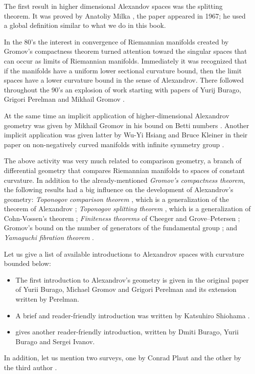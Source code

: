 The first result in higher dimensional Alexandov spaces was the splitting theorem.
It was proved by Anatoliy Milka \cite{milka-line}, the paper appeared in 1967;
he used a global definition similar to what we do in this book.

In the 80's the interest in convergence of Riemannian manifolds created by Gromov's compactness theorem \cite{gromov-MS} turned attention toward the singular spaces that can occur as limits of Riemannian manifolds.
Immediately it was recognized that if the manifolds have a uniform lower sectional curvature bound, then the limit spaces have a lower curvature bound in the sense of Alexandrov. 
There followed throughout the 90's an explosion of work starting with papers of Yurij Burago, Grigori Perelman and Mikhail Gromov  \cite{burago-gromov-perelman,perelman:spaces2}.

At the same time an implicit application of higher-dimensional Alexandrov geometry was given by Mikhail Gromov in his bound on Betti numbers \cite{gromov:betti}.
Another implicit application was given latter by Wu-Yi Hsiang and Bruce Kleiner in their paper on non-negatively curved manifolds with infinite symmetry group \cite{hsiang-kleiner}.

The above activity was very much related to comparison geometry,
a branch of differential geometry that compares Riemannian manifolds  to  spaces of constant curvature.
In addition to the already-mentioned \emph{Gromov's compactness theorem},
the following results had a big influence on the development of Alexandrov's geometry:
\emph{Toponogov comparison theorem} \cite{toponogov-globalization+splitting}, which is a generalization of the theorem of Alexandrov \cite{alexandrov-comparison};
\emph{Toponogov splitting theorem} \cite{toponogov-globalization+splitting}, which is a generalization of Cohn-Vossen's theorem \cite{cohn-vossen_line};
\emph{Finiteness theorems} of
Cheeger
and
Grove--Petersen \cite{cheeger-finiteness,grove-petersen:finiteness};
Gromov's bound on the number of generators of the fundamental group 
\cite[1.5]{gomov:almost-flat};
and 
\emph{Yamaguchi fibration theorem} \cite{yamaguchi-fibration}.


Let us give a list of available introductions to  Alexandrov spaces with curvature bounded below: 
\begin{itemize}
\item The first introduction to Alexandrov's geometry is given in the original paper of Yurii Burago, Michael Gromov and Grigori Perelman \cite{burago-gromov-perelman} 
and its extension \cite{perelman:spaces2} written by Perelman.
\item A brief and reader-friendly introduction was written by Katsuhiro Shiohama \cite[Sections 1--8]{shiohama}.
\item \cite[Chapter 10]{burago-burago-ivanov} gives another reader-friendly introduction, written by Dmiti Burago, Yurii Burago and Sergei Ivanov.
\end{itemize}
In addition, let us mention two surveys, one by Conrad Plaut \cite{plaut:survey} and the other by the third author \cite{petrunin:survey}.

